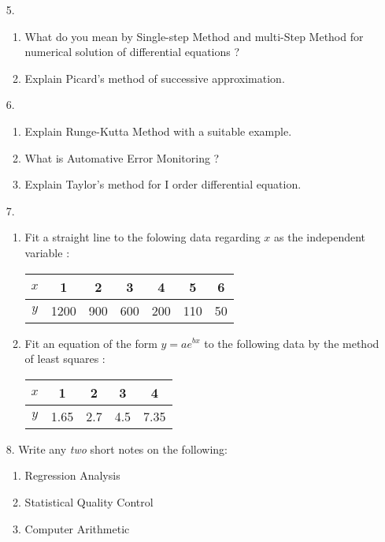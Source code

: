 \documentclass[12pt]{article}
\begin{document}
\begin{enumerate}
	\item[5.]
	\begin{enumerate}
		\item What do you mean by Single-step Method and multi-Step Method for numerical solution of differential equations ?
		\item Explain Picard's method of successive approximation.
	\end{enumerate}

	\item[6.]
	\begin{enumerate}
		\item Explain Runge-Kutta Method with a suitable example.
		\item What is Automative Error Monitoring ?
		\item Explain Taylor's method for I order differential equation.
	\end{enumerate}

	\item[7.]
	\begin{enumerate}
		\item Fit a straight line to the folowing data regarding $x$ as the independent variable :
			\begin{center}
				\begin{tabular}{|c|c|c|c|c|c|c|}
					\hline
					$x$ & 1    & 2   & 3   & 4   & 5   & 6  \\
					\hline
					$y$ & 1200 & 900 & 600 & 200 & 110 & 50 \\
					\hline
				\end{tabular}
			\end{center}
		\item Fit an equation of the form $y=ae^{bx}$ to the following data by the method of least squares :
			\begin{center}
				\begin{tabular}{|c|c|c|c|c|}
					\hline
					$x$ & 1    & 2   & 3   & 4    \\
					\hline
					$y$ & 1.65 & 2.7 & 4.5 & 7.35 \\
					\hline
				\end{tabular}
			\end{center}
	\end{enumerate}

	\item[8.] Write any \textit{two} short notes on the following:
	\begin{enumerate}
		\item Regression Analysis
		\item Statistical Quality Control
		\item Computer Arithmetic
	\end{enumerate}

\end{enumerate}
\end{document}
